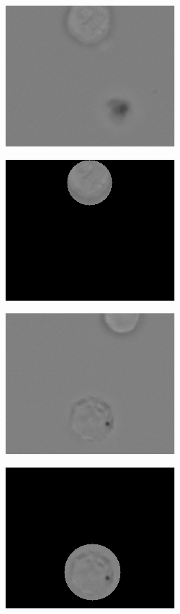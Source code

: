 \begin{figure}[t]
	\begin{center}
		\begin{subfigure}[b]{0.33\textwidth}
			\includegraphics[height= 0.20\textheight]{thesis-template-master/images/hd1 (4400).png}
			\caption{}
			\label{fig:res18}
		\end{subfigure}
		\begin{subfigure}[b]{0.33\textwidth}
			\includegraphics[height= 0.20\textheight]{thesis-template-master/images/hd1 (4400) (1).png}
			\caption{}
			\label{fig:cellnet}
		\end{subfigure}
		\begin{subfigure}[b]{0.33\textwidth}
			\includegraphics[height= 0.20\textheight]{thesis-template-master/images/hd1 (4550).png}
			\caption{}
			\label{fig:cellnet}
		\end{subfigure}
		\begin{subfigure}[b]{0.33\textwidth}
			\includegraphics[height= 0.20\textheight]{thesis-template-master/images/hd1 (4550) (1).png}

\end{subfigure}
\end{center}
\end{figure}
